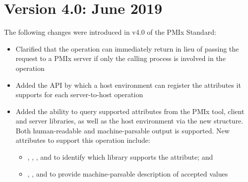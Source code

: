 \section{Version 4.0: June 2019}

The following changes were introduced in v4.0 of the PMIx Standard:

\begin{itemize}
    \item Clarified that the  operation can immediately return  in lieu of passing the request to a \ac{PMIx} server if only the calling process is involved in the operation
    \item Added the  \ac{API} by which a host environment can register the attributes it supports for each server-to-host operation
    \item Added the ability to query supported attributes from the \ac{PMIx} tool, client and server libraries, as well as the host environment via the new  structure. Both human-readable and machine-parsable output is supported. New attributes to support this operation include:
    \begin{itemize}
        \item {}, , , and  to identify which library supports the attribute; and
        \item {}, , and  to provide machine-parsable description of accepted values
    \end{itemize}
\end{itemize}
